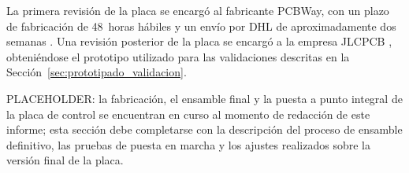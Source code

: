 La primera revisi\'on de la placa se encarg\'o al fabricante PCBWay,
con un plazo de fabricaci\'on de 48~horas h\'abiles y un env\'io por DHL
de aproximadamente dos semanas \cite{informeMarzo2026}. Una revisi\'on
posterior de la placa se encarg\'o a la empresa JLCPCB
\cite{informeAbril2026}, obteni\'endose el prototipo utilizado para las
validaciones descritas en la Secci\'on~\ref{sec:prototipado_validacion}.

PLACEHOLDER: la fabricaci\'on, el ensamble final y la puesta a punto
integral de la placa de control se encuentran en curso al momento de
redacci\'on de este informe; esta secci\'on debe completarse con la
descripci\'on del proceso de ensamble definitivo, las pruebas de
puesta en marcha y los ajustes realizados sobre la versi\'on final de
la placa.
